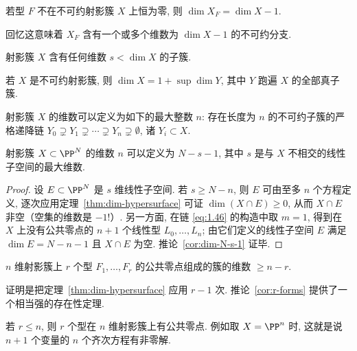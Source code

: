 \begin{theorem}\label{thm:dim-hypersurface}
	若型 $F$ 不在不可约射影簇 $X$ 上恒为零, 则 $\dim X_F = \dim X - 1$.
\end{theorem}

回忆这意味着 $X_F$ 含有一个或多个维数为 $\dim X - 1$ 的不可约分支.

\begin{corollary}\label{cor:subvariety-dims}
	射影簇 $X$ 含有任何维数 $s < \dim X$ 的子簇.
\end{corollary}

\begin{corollary}[维数的归纳定义]\label{cor:inductive-dim}
	若 $X$ 是不可约射影簇, 则 $\dim X = 1 + \sup \dim Y$, 其中 $Y$ 跑遍 $X$ 的全部真子簇.
\end{corollary}

\begin{corollary}\label{cor:chain-dim}
	射影簇 $X$ 的维数可以定义为如下的最大整数 $n$: 存在长度为 $n$ 的不可约子簇的严格递降链 $Y_0 \supsetneq Y_1 \supsetneq \cdots \supsetneq Y_n \supsetneq \emptyset$, 诸 $Y_i \subset X$.
\end{corollary}

\begin{corollary}\label{cor:dim-N-s-1}
	射影簇 $X \subset \PP^N$ 的维数 $n$ 可以定义为 $N - s - 1$, 其中 $s$ 是与 $X$ 不相交的线性子空间的最大维数.
\end{corollary}

\begin{proof}
	设 $E \subset \PP^N$ 是 $s$ 维线性子空间. 若 $s \ge N - n$, 则 $E$ 可由至多 $n$ 个方程定义, 逐次应用定理~\ref{thm:dim-hypersurface} 可证 $\dim(X \cap E) \ge 0$, 从而 $X \cap E$ 非空（空集的维数是 $-1$!）. 另一方面, 在链 \eqref{eq:1.46} 的构造中取 $m = 1$, 得到在 $X$ 上没有公共零点的 $n+1$ 个线性型 $L_0, \ldots, L_n$; 由它们定义的线性子空间 $E$ 满足 $\dim E = N - n - 1$ 且 $X \cap E$ 为空. 推论~\ref{cor:dim-N-s-1} 证毕.
\end{proof}

\begin{corollary}\label{cor:r-forms}
	$n$ 维射影簇上 $r$ 个型 $F_1, \ldots, F_r$ 的公共零点组成的簇的维数 $\ge n - r$.
\end{corollary}

证明是把定理~\ref{thm:dim-hypersurface} 应用 $r-1$ 次. 推论~\ref{cor:r-forms} 提供了一个相当强的存在性定理.

\begin{proposition}\label{prop:common-zero}
	若 $r \le n$, 则 $r$ 个型在 $n$ 维射影簇上有公共零点. 例如取 $X = \PP^n$ 时, 这就是说 $n+1$ 个变量的 $n$ 个齐次方程有非零解.
\end{proposition}

